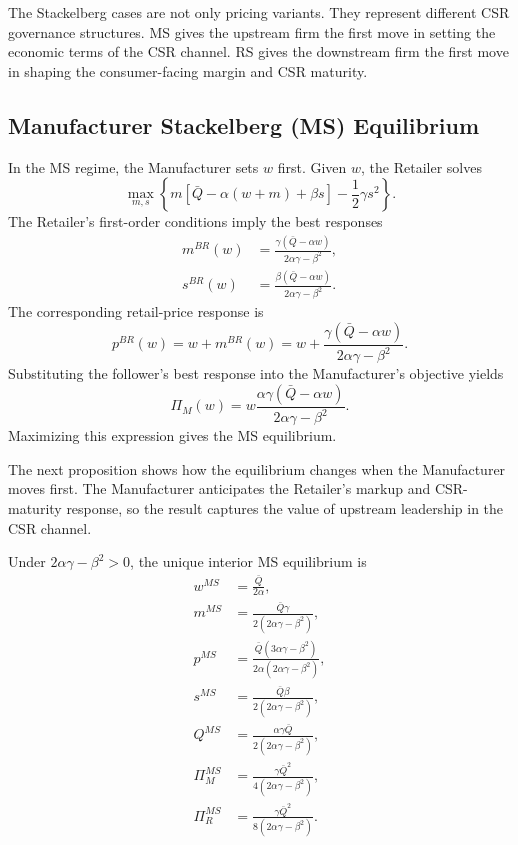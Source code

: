 The Stackelberg cases are not only pricing variants. They represent different CSR governance structures. MS gives the upstream firm the first move in setting the economic terms of the CSR channel. RS gives the downstream firm the first move in shaping the consumer-facing margin and CSR maturity.

\subsection{Manufacturer Stackelberg (MS) Equilibrium}

In the MS regime, the Manufacturer sets $w$ first. Given $w$, the Retailer solves
\begin{equation*}
    \max_{m,s}\left\{m\left[\bar{Q}-\alpha(w+m)+\beta s\right]-\frac12\gamma s^2\right\}.
\end{equation*}
The Retailer's first-order conditions imply the best responses
\begin{align*}
    m^{BR}(w)&=\frac{\gamma(\bar{Q}-\alpha w)}{2\alpha\gamma-\beta^2},\\
    s^{BR}(w)&=\frac{\beta(\bar{Q}-\alpha w)}{2\alpha\gamma-\beta^2}.
\end{align*}
The corresponding retail-price response is
\begin{equation*}
    p^{BR}(w)=w+m^{BR}(w)
    =w+\frac{\gamma(\bar{Q}-\alpha w)}{2\alpha\gamma-\beta^2}.
\end{equation*}
Substituting the follower's best response into the Manufacturer's objective yields
\begin{equation*}
    \Pi_M(w)=w\frac{\alpha\gamma(\bar{Q}-\alpha w)}{2\alpha\gamma-\beta^2}.
\end{equation*}
Maximizing this expression gives the MS equilibrium.

The next proposition shows how the equilibrium changes when the Manufacturer moves first. The Manufacturer anticipates the Retailer's markup and CSR-maturity response, so the result captures the value of upstream leadership in the CSR channel.

\begin{proposition}
\label{prop:ms}
Under $2\alpha\gamma-\beta^2>0$, the unique interior MS equilibrium is
\begin{align*}
    w^{MS} &= \frac{\bar{Q}}{2\alpha},\\
    m^{MS} &= \frac{\bar{Q}\gamma}{2(2\alpha\gamma-\beta^2)},\\
    p^{MS} &= \frac{\bar{Q}(3\alpha\gamma-\beta^2)}{2\alpha(2\alpha\gamma-\beta^2)},\\
    s^{MS} &= \frac{\bar{Q}\beta}{2(2\alpha\gamma-\beta^2)},\\
    Q^{MS} &= \frac{\alpha\gamma\bar{Q}}{2(2\alpha\gamma-\beta^2)},\\
    \Pi_M^{MS} &= \frac{\gamma\bar{Q}^2}{4(2\alpha\gamma-\beta^2)},\\
    \Pi_R^{MS} &= \frac{\gamma\bar{Q}^2}{8(2\alpha\gamma-\beta^2)}.
\end{align*}
\end{proposition}

